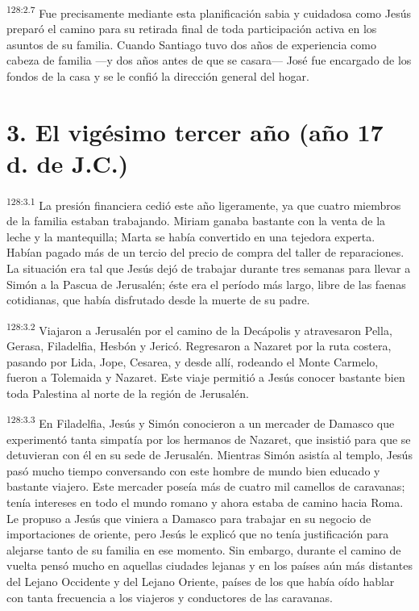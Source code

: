 \par 
\textsuperscript{128:2.7} Fue precisamente mediante esta planificación sabia y cuidadosa como Jesús preparó el camino para su retirada final de toda participación activa en los asuntos de su familia. Cuando Santiago tuvo dos años de experiencia como cabeza de familia ---y dos años antes de que se casara--- José fue encargado de los fondos de la casa y se le confió la dirección general del hogar.

\section*{3. El vigésimo tercer año (año 17 d. de J.C.)}
\par 
\textsuperscript{128:3.1} La presión financiera cedió este año ligeramente, ya que cuatro miembros de la familia estaban trabajando. Miriam ganaba bastante con la venta de la leche y la mantequilla; Marta se había convertido en una tejedora experta. Habían pagado más de un tercio del precio de compra del taller de reparaciones. La situación era tal que Jesús dejó de trabajar durante tres semanas para llevar a Simón a la Pascua de Jerusalén; éste era el período más largo, libre de las faenas cotidianas, que había disfrutado desde la muerte de su padre.

\par 
\textsuperscript{128:3.2} Viajaron a Jerusalén por el camino de la Decápolis y atravesaron Pella, Gerasa, Filadelfia, Hesbón y Jericó. Regresaron a Nazaret por la ruta costera, pasando por Lida, Jope, Cesarea, y desde allí, rodeando el Monte Carmelo, fueron a Tolemaida y Nazaret. Este viaje permitió a Jesús conocer bastante bien toda Palestina al norte de la región de Jerusalén.

\par 
\textsuperscript{128:3.3} En Filadelfia, Jesús y Simón conocieron a un mercader de Damasco que experimentó tanta simpatía por los hermanos de Nazaret, que insistió para que se detuvieran con él en su sede de Jerusalén. Mientras Simón asistía al templo, Jesús pasó mucho tiempo conversando con este hombre de mundo bien educado y bastante viajero. Este mercader poseía más de cuatro mil camellos de caravanas; tenía intereses en todo el mundo romano y ahora estaba de camino hacia Roma. Le propuso a Jesús que viniera a Damasco para trabajar en su negocio de importaciones de oriente, pero Jesús le explicó que no tenía justificación para alejarse tanto de su familia en ese momento. Sin embargo, durante el camino de vuelta pensó mucho en aquellas ciudades lejanas y en los países aún más distantes del Lejano Occidente y del Lejano Oriente, países de los que había oído hablar con tanta frecuencia a los viajeros y conductores de las caravanas.


